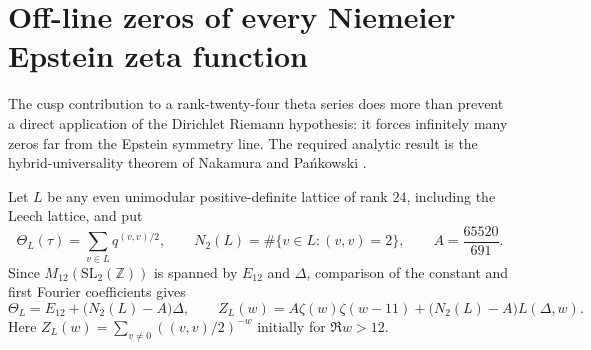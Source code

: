 \section{Off-line zeros of every Niemeier Epstein zeta function}
\label{sec:niemeier-zeros}
The cusp contribution to a rank-twenty-four theta series does more than
prevent a direct application of the Dirichlet Riemann hypothesis: it
forces infinitely many zeros far from the Epstein symmetry line.
The required analytic result is the hybrid-universality theorem of
Nakamura and Pa\'nkowski \cite[Main Theorems~1--2]{NP2016}.

Let $L$ be any even unimodular positive-definite lattice of rank $24$,
including the Leech lattice, and put
\[
 \Theta_L(\tau)=\sum_{v\in L}q^{(v,v)/2},\qquad
 N_2(L)=\#\{v\in L:(v,v)=2\},\qquad A=\frac{65520}{691}.
\]
Since $M_{12}(\mathrm{SL}_2(\mathbb Z))$ is spanned by $E_{12}$ and
$\Delta$, comparison of the constant and first Fourier coefficients gives
\begin{equation}\label{eq:niemeier-zeta-decomposition}
 \Theta_L=E_{12}+\bigl(N_2(L)-A\bigr)\Delta,\qquad
 Z_L(w)=A\zeta(w)\zeta(w-11)+\bigl(N_2(L)-A\bigr)L(\Delta,w).
\end{equation}
Here $Z_L(w)=\sum_{v\ne0}((v,v)/2)^{-w}$ initially for $\Re w>12$.

